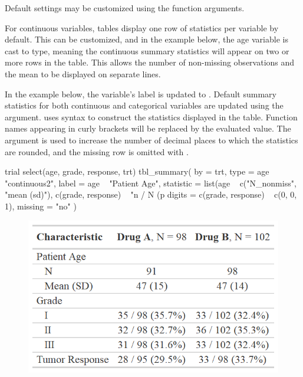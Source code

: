 Default settings may be customized using the  function arguments.



For continuous variables, tables display one row of statistics per variable by default.
This can be customized, and in the example below, the age variable is cast to  type, meaning the continuous summary statistics will appear on two or more rows in the table.
This allows the number of non-missing observations and the mean to be displayed on separate lines.

In the example below, the  variable's label is updated to .
Default summary statistics for both continuous and categorical variables are updated using the  argument.
 uses  \citep{glue} syntax to construct the statistics displayed in the table.
Function names appearing in curly brackets will be replaced by the evaluated value.
The  argument is used to increase the number of decimal places to which the statistics are rounded, and the missing row is omitted with .

\begin{example}
trial %
  select(age, grade, response, trt) %
  tbl_summary(
    by = trt,
    type = age ~ "continuous2",
    label = age ~ "Patient Age",
    statistic = list(age ~ c("{N_nonmiss}", "{mean} ({sd})"),
                     c(grade, response) ~ "{n} / {N} ({p}%
    digits = c(grade, response) ~ c(0, 0, 1),
    missing = "no"
  )
\end{example}
\begin{figure}[h!]
  \includegraphics[scale=0.73]{summary_plus.png}
  \centering
\end{figure}

